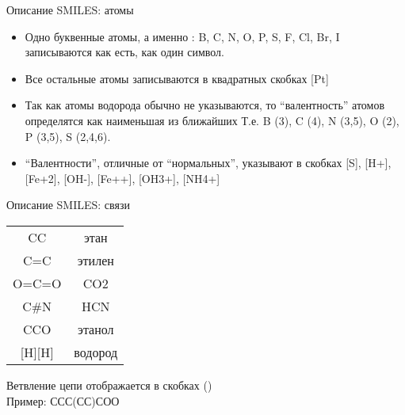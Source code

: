\begin{frame}{Описание SMILES: атомы}
	\begin{itemize}
		\item	 Одно буквенные атомы, а именно :  B, C, N, O, P, S, F, Cl, Br,  I записываются как есть, как один символ.
		\item  Все остальные атомы записываются в квадратных скобках [Pt]
		\item  Так как атомы водорода обычно не указываются, то “валентность” атомов определятся как наименьшая из ближайших Т.е.  B (3), C (4), N (3,5), O (2), P (3,5), S (2,4,6).
		\item   “Валентности”, отличные от “нормальных”, указывают в скобках [S], [H+], [Fe+2], [OH-], [Fe++], [OH3+], [NH4+]
		\end{itemize}
\end{frame}


\begin{frame}[fragile]{Описание SMILES: связи}
\begin{center}
	\begin{tabular}{c c}
		\hline
	CC & этан \\
	C=C & этилен\\
	O=C=O &  CO2 \\
	C{\#}N & HCN \\
	CCO & этанол \\
	{[H][H]}  & водород \\
		\hline
	\end{tabular}
\end{center}
	\vspace{1cm}
	Ветвление цепи отображается в скобках () \\
	Пример: ССС(СС)СОО
\end{frame}

